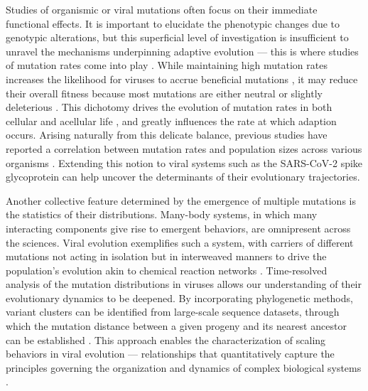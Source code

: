 \documentclass[%
 reprint,
superscriptaddress,
 amsmath,amssymb,
 aps,
]{revtex4-2}
\begin{document}
Studies of organismic or viral mutations often focus on their immediate functional effects. It is important to elucidate the phenotypic changes due to genotypic alterations, but this superficial level of investigation is insufficient to unravel the mechanisms underpinning adaptive evolution --- this is where studies of mutation rates come into play \cite{LYNCH2010345, 10.1128/jvi.01031-17}. While maintaining high mutation rates increases the likelihood for viruses to accrue beneficial mutations \cite{Duffy2018}, it may reduce their overall fitness because most mutations are either neutral or slightly deleterious \cite{10.1038/217624a0, 10.1038/246096a0, Sprouffske2018}. This dichotomy drives the evolution of mutation rates in both cellular and acellular life \cite{Lynch2016, 10.1371/journal.ppat.1001005}, and greatly influences the rate at which adaption occurs. Arising naturally from this delicate balance, previous studies have reported a correlation between mutation rates and population sizes across various organisms \cite{LYNCH2010345}. Extending this notion to viral systems such as the SARS-CoV-2 spike glycoprotein can help uncover the determinants of their evolutionary trajectories.

Another collective feature determined by the emergence of multiple mutations is the statistics of their distributions. Many-body systems, in which many interacting components give rise to emergent behaviors, are omnipresent across the sciences. Viral evolution exemplifies such a system, with carriers of different mutations not acting in isolation but in interweaved manners to drive the population’s evolution akin to chemical reaction networks \cite{Eigen1971, 10.1371/journal.ppat.1001005, doi:10.1128/mmbr.05023-11}. Time-resolved analysis of the mutation distributions in viruses allows our understanding of their evolutionary dynamics to be deepened. By incorporating phylogenetic methods, variant clusters can be identified from large-scale sequence datasets, through which the mutation distance between a given progeny and its nearest ancestor can be established \cite{10.1093/ve/veab064, Hadfield2018}. This approach enables the characterization of scaling behaviors in viral evolution --- relationships that quantitatively capture the principles governing the organization and dynamics of complex biological systems \cite{Brown2002, 10.1242/jeb.01589, Newman01092005}.
\end{document}
